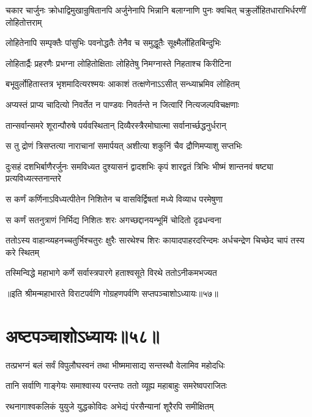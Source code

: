 \onelineshloka
{चकार चार्जुनः क्रोधाद्विमुखान्रुषितानपि}
\twolineshloka
{अर्जुनेनापि भिन्नानि बलाग्नाणि पुनः क्वचित्}
{चक्रुर्लोहितधाराभिर्धरणीं लोहितोत्तराम्}


\twolineshloka
{लोहितेनापि सम्पृक्तैः पांसुभिः पवनोद्धतैः}
{तेनैव च समुद्धूतैः सूक्ष्मैर्लोहितबिन्दुभिः}


\twolineshloka
{लोहितार्द्रैः प्रहरणैः प्रभग्ना लोहितोक्षिताः}
{लोहितेषु निमग्नास्ते निहताश्च किरीटिना}


\twolineshloka
{बभूवुर्लोहितास्तत्र भृशमादित्यरश्मयः}
{आकाशं तत्क्षणेनाऽऽसीत् सन्ध्याभ्रमिव लोहितम्}


\twolineshloka
{अप्यस्तं प्राप्य चादित्यो निवर्तेत न पाण्डवः}
{निवर्तन्ते न जित्वारिं नित्यजल्पविचक्षणाः}


\twolineshloka
{तान्सर्वान्समरे शूरान्पौरुषे पर्यवस्थितान्}
{दिव्यैरस्त्रैरमोघात्मा सर्वानार्च्छद्धनुर्धरान्}


\twolineshloka
{स तु द्रोणं त्रिसप्तत्या नाराचानां समार्पयत्}
{अशीत्या शकुनिं चैव द्रौणिमप्याशु सप्तभिः}


\threelineshloka
{दुःसहं दशभिर्बाणैरर्जुनः समविध्यत}
{दुश्यासनं द्वादशभिः कृपं शारद्वतं त्रिभिः}
{भीष्मं शान्तनवं षष्ट्या प्रत्यविध्यत्स्तनान्तरे}


\twolineshloka
{स कर्णं कर्णिनाऽविध्यत्पीतेन निशितेन च}
{वासविर्द्विषतां मध्ये विव्याध परमेषुणा}


\twolineshloka
{स कर्णं सतनुत्राणं निर्भिद्य निशितः शरः}
{अगच्छद्दानयन्भूमिं चोदितो दृढधन्वना}


\threelineshloka
{ततोऽस्य वाहान्व्यहनच्चतुर्भिश्चतुरः क्षुरैः}
{सारथेश्च शिरः कायादपाहरदरिन्दमः}
{अर्धचन्द्रेण चिच्छेद चापं तस्य करे स्थितम्}


\twolineshloka
{तस्मिन्विद्धे महाभागे कर्णे सर्वास्त्रपारगे}
{हताश्वसूते विरथे ततोऽनीकमभज्यत}

॥इति श्रीमन्महाभारते विराटपर्वणि गोग्रहणपर्वणि सप्तपञ्चाशोऽध्यायः॥५७॥

\chapter{अष्टपञ्चाशोऽध्यायः॥५८॥}

\twolineshloka
{तत्प्रभग्नं बलं सर्वं विपुलौघस्वनं तथा}
{भीष्ममासाद्य सन्तस्थौ वेलामिव महोदधिः}


\twolineshloka
{तानि सर्वाणि गाङ्गेयः समाश्वास्य परन्तपः}
{ततो व्यूह्य महाबाहुः समरेष्वपराजितः}


\twolineshloka
{रथनागाश्वकलिकं युयुजे युद्धकोविदः}
{अभेद्यं पंरसैन्यानां शूरैरपि समीक्षितम्}


